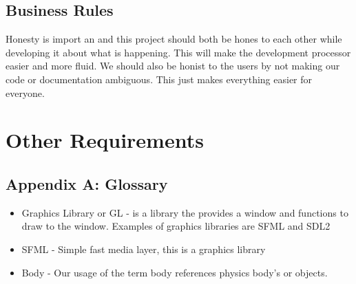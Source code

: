 \documentclass{scrreprt}
\begin{document}
\section{Business Rules}
Honesty is import an and this project should both be hones to each other while developing it about what is happening. This will make the development processor easier and more fluid.  We should also be honist to the users by not making our code or documentation ambiguous.  This just makes everything easier for everyone.



\chapter{Other Requirements}

\section{Appendix A: Glossary}

\begin{itemize}
\item 	Graphics Library or GL - is a library the provides a window and functions to draw to the window.  Examples of graphics libraries are SFML and SDL2
\item 	SFML - Simple fast media layer, this is a graphics library
\item 	Body - Our usage of the term body references physics body's or objects. 
\end{itemize}


\end{document}
